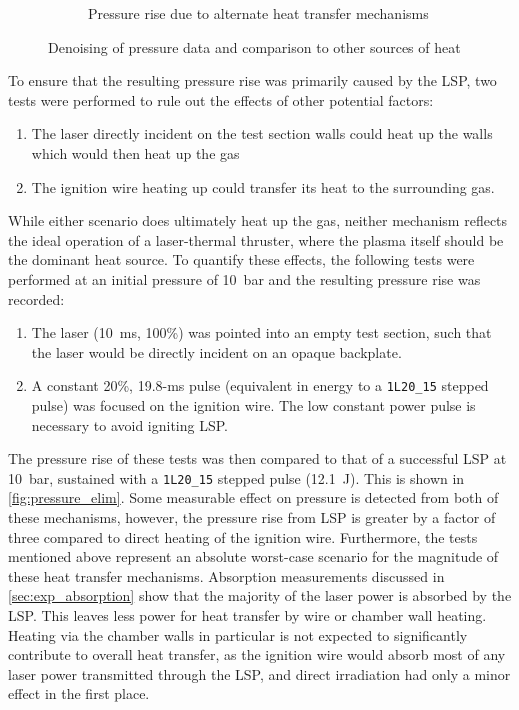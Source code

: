 \begin{figure}[h]
\begin{subfigure}[t]{0.47\textwidth}
                    \caption{Pressure rise due to alternate heat transfer mechanisms}
                    \label{fig:pressure_elim}
                \end{subfigure}
                \caption{Denoising of pressure data and comparison to other sources of heat}
            \end{figure}

            
            To ensure that the resulting pressure rise was primarily caused by the LSP, two tests were performed to rule out the effects of other potential factors:
            \begin{enumerate}
                \item The laser directly incident on the test section walls could heat up the walls which would then heat up the gas
                \item The ignition wire heating up could transfer its heat to the surrounding gas.
            \end{enumerate}
            While either scenario does ultimately heat up the gas, neither mechanism reflects the ideal operation of a laser-thermal thruster, where the plasma itself should be the dominant heat source. To quantify these effects, the following tests were performed at an initial pressure of \qty{10}{bar} and the resulting pressure rise was recorded:
            \begin{enumerate}
                \item The laser (\qty{10}{ms}, 100\%) was pointed into an empty test section, such that the laser would be directly incident on an opaque backplate.
                \item A constant 20\%, \num{19.8}-\unit{ms} pulse (equivalent in energy to a \texttt{1L20\_15} stepped pulse) was focused on the ignition wire. The low constant power pulse is necessary to avoid igniting LSP.
            \end{enumerate}
            The pressure rise of these tests was then compared to that of a successful LSP at \qty{10}{bar}, sustained with a \texttt{1L20\_15} stepped pulse (\qty{12.1}{J}). This is shown in \autoref{fig:pressure_elim}. Some measurable effect on pressure is detected from both of these mechanisms, however, the pressure rise from LSP is greater by a factor of three compared to direct heating of the ignition wire. Furthermore, the tests mentioned above represent an absolute worst-case scenario for the magnitude of these heat transfer mechanisms. Absorption measurements discussed in \autoref{sec:exp_absorption} show that the majority of the laser power is absorbed by the LSP. This leaves less power for heat transfer by wire or chamber wall heating. Heating via the chamber walls in particular is not expected to significantly contribute to overall heat transfer, as the ignition wire would absorb most of any laser power transmitted through the LSP, and direct irradiation had only a minor effect in the first place.

